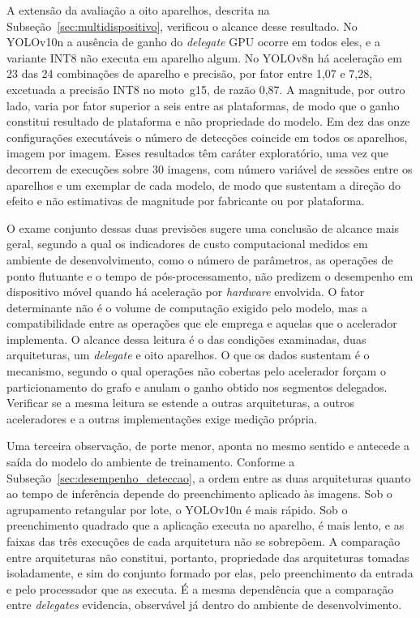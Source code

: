 \documentclass[artigo,times,capa]{iftex2024}
\begin{document}
A extensão da avaliação a oito aparelhos, descrita na
Subseção~\ref{sec:multidispositivo}, verificou o alcance desse resultado. No YOLOv10n a ausência de ganho do \textit{delegate} \ac{GPU} ocorre em todos eles, e a variante \ac{INT8} não executa em aparelho algum. No YOLOv8n há aceleração em 23 das 24 combinações de aparelho e precisão, por fator entre 1,07 e 7,28, excetuada a precisão \ac{INT8} no moto~g15, de razão 0,87. A magnitude, por outro lado, varia por fator superior a seis entre as
plataformas, de modo que o ganho constitui resultado de plataforma e não propriedade do modelo. Em dez
das onze configurações executáveis o número de detecções coincide em todos os
aparelhos, imagem por imagem. Esses resultados têm caráter exploratório, uma
vez que decorrem de execuções sobre 30 imagens, com número variável de sessões
entre os aparelhos e um exemplar de cada modelo, de modo que sustentam a
direção do efeito e não estimativas de magnitude por fabricante ou por
plataforma.

O exame conjunto dessas duas previsões sugere uma conclusão de alcance mais geral, segundo a qual os indicadores de custo computacional medidos em ambiente de desenvolvimento, como o número de parâmetros, as operações de ponto flutuante e o tempo de pós-processamento, não predizem o desempenho em dispositivo móvel quando há aceleração por \textit{hardware} envolvida. O fator determinante não é o volume de computação exigido pelo modelo,
mas a compatibilidade entre as operações que ele emprega e aquelas que o
acelerador implementa. O alcance dessa leitura é o das condições examinadas,
duas arquiteturas, um \textit{delegate} e oito aparelhos. O que os dados
sustentam é o mecanismo, segundo o qual operações não cobertas pelo acelerador
forçam o particionamento do grafo e anulam o ganho obtido nos segmentos
delegados. Verificar se a mesma leitura se estende a outras arquiteturas, a
outros aceleradores e a outras implementações exige medição própria.

Uma terceira observação, de porte menor, aponta no mesmo sentido e antecede
a saída do modelo do ambiente de treinamento. Conforme a
Subseção~\ref{sec:desempenho_deteccao}, a ordem entre as duas arquiteturas
quanto ao tempo de inferência depende do preenchimento aplicado às imagens.
Sob o agrupamento retangular por lote, o YOLOv10n é mais rápido. Sob o
preenchimento quadrado que a aplicação executa no aparelho, é mais lento, e
as faixas das três execuções de cada arquitetura não se sobrepõem. A
comparação entre arquiteturas não constitui, portanto, propriedade das
arquiteturas tomadas isoladamente, e sim do conjunto formado por elas, pelo
preenchimento da entrada e pelo processador que as executa. É a mesma
dependência que a comparação entre \textit{delegates} evidencia, observável
já dentro do ambiente de desenvolvimento.
\end{document}
